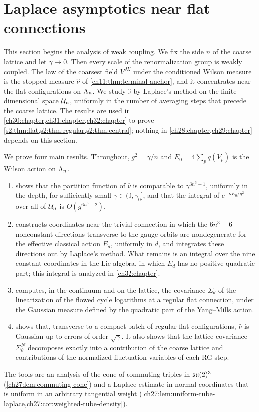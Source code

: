 \chapter{Laplace asymptotics near flat connections}\label{ch27:chapter}

This section begins the analysis of weak coupling. We fix the side $n$ of the coarse lattice and let $\gamma\to0$. Then every scale of the renormalization group is weakly coupled. The law of the coarsest field $V^{JK}$ under the conditioned Wilson measure is the stopped measure $\widehat\nu$ of \cref{ch11:thm:terminal-anchor}, and it concentrates near the flat configurations on $\Lambda_{n}$. We study $\widehat\nu$ by Laplace's method on the finite-dimensional space $\mathcal U_{n}$, uniformly in the number of averaging steps that precede the coarse lattice. The results are used in \cref{ch30:chapter,ch31:chapter,ch32:chapter} to prove \cref{s2:thm:flat,s2:thm:regular,s2:thm:central}; nothing in \cref{ch28:chapter,ch29:chapter} depends on this section.

We prove four main results. Throughout, $g^2=\gamma/n$ and $E_0=4\sum_pq(V_p)$ is the Wilson action on $\Lambda_{n}$.
\begin{enumerate}
\item {} shows that the partition function of $\widehat\nu$ is comparable to $\gamma^{3n^3-1}$, uniformly in the depth, for sufficiently small $\gamma\in(0,\gamma_0]$, and that the integral of $e^{-\kappa E_0/g^2}$ over all of $\mathcal U_{n}$ is $O(g^{6n^3-2})$.
\item {} constructs coordinates near the trivial connection in which the $6n^3-6$ nonconstant directions transverse to the gauge orbits are nondegenerate for the effective classical action $E_d$, uniformly in $d$, and integrates these directions out by Laplace's method. What remains is an integral over the nine constant coordinates in the Lie algebra, in which $E_d$ has no positive quadratic part; this integral is analyzed in \cref{ch32:chapter}.
\item {} computes, in the continuum and on the lattice, the covariance $\Sigma_\theta$ of the linearization of the flowed cycle logarithms at a regular flat connection, under the Gaussian measure defined by the quadratic part of the Yang--Mills action.
\item {} shows that, transverse to a compact patch of regular flat configurations, $\widehat\nu$ is Gaussian up to errors of order $\sqrt\gamma$. It also shows that the lattice covariance $\Sigma_\theta^N$ decomposes exactly into a contribution of the coarse lattice and contributions of the normalized fluctuation variables of each RG step.
\end{enumerate}
The tools are an analysis of the cone of commuting triples in $\mathfrak{su}(2)^3$ (\cref{ch27:lem:commuting-cone}) and a Laplace estimate in normal coordinates that is uniform in an arbitrary tangential weight (\cref{ch27:lem:uniform-tube-laplace,ch27:cor:weighted-tube-density}).

